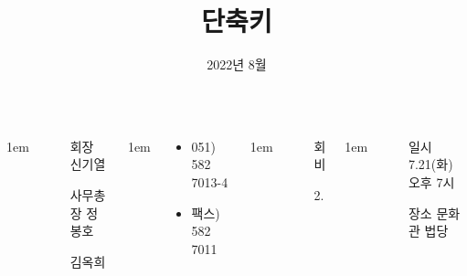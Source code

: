 \documentclass[	20pt, 
							a1paper, 
							portrait, %
							margin=0mm, %
							innermargin=10mm,  		%
							colspace=5mm, 
							subcolspace=0mm
							]{tikzposter}
\title{단축키}
\author{ 2022년 8월 }
\begin{document}
	\maketitle

	\begin{columns}


			{
					\setlength{\leftmargini}{7em}
					\setlength{\labelsep} {1em}
				\begin{LARGE}
					\begin{itemize}
					\item [회장] 신기열
					\item [사무총장]정봉호
					\item [] 김옥희
					\end{itemize}
				\end{LARGE}
			}

			{
					\setlength{\leftmargini}{7em}
					\setlength{\labelsep} {1em}
				\begin{LARGE}
					\begin{itemize}
					\item 051) 582 7013-4
					\item 팩스) 582 7011
					\end{itemize}
				\end{LARGE}
			}


			{
					\setlength{\leftmargini}{4em}
					\setlength{\labelsep} {1em}
				\begin{LARGE}
					\begin{itemize}
					\item [회비]
					\item [2.] 
					\end{itemize}
				\end{LARGE}
			}



			{
					\setlength{\leftmargini}{4em}
					\setlength{\labelsep} {1em}
				\begin{LARGE}
					\begin{itemize}
					\item [일시] 7.21(화) 오후 7시
					\item [장소] 문화관 법당
					\end{itemize}
				\end{LARGE}
			}



\end{columns}
\end{document}
